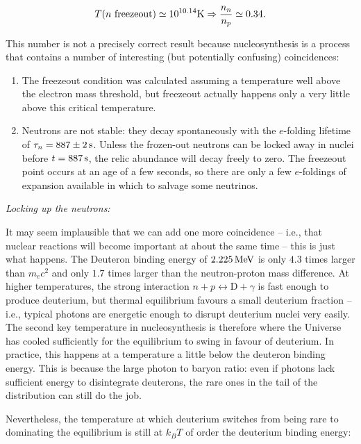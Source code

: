 \documentclass[a4paper,11pt]{article}
\begin{document}
\begin{align*}
    T(n~{\rm freezeout}) \simeq 10^{10.14} {\rm K} \Rightarrow \frac{n_n}{n_p} \simeq 0.34.
\end{align*}

{\noindent}This number is not a precisely correct result because nucleosynthesis is a process that contains a number of interesting (but potentially confusing) coincidences:

\begin{enumerate}
  \item The freezeout condition was calculated assuming a temperature well above the electron mass threshold, but freezeout actually happens only a very little above this critical temperature.
  \item Neutrons are not stable: they decay spontaneously with the $e$-folding lifetime of $\tau_n=887\pm2\,{\rm s}$. Unless the frozen-out neutrons can be locked away in nuclei before $t=887\,{\rm s}$, the relic abundance will decay freely to zero. The freezeout point occurs at an age of a few seconds, so there are only a few $e$-foldings of expansion available in which to salvage some neutrinos.
\end{enumerate}

{\noindent}\textit{Locking up the neutrons:}

{\noindent}It may seem implausible that we can add one more coincidence -- i.e., that nuclear reactions will become important at about the same time -- this is just what happens. The Deuteron binding energy of $2.225\,{\rm MeV}$ is only $4.3$ times larger than $m_ec^2$ and only $1.7$ times larger than the neutron-proton mass difference. At higher temperatures, the strong interaction $n+p \leftrightarrow \mathrm{D}+\gamma$ is fast enough to produce deuterium, but thermal equilibrium favours a small deuterium fraction -- i.e., typical photons are energetic enough to disrupt deuterium nuclei very easily. The second key temperature in nucleosynthesis is therefore where the Universe has cooled sufficiently for the equilibrium to swing in favour of deuterium. In practice, this happens at a temperature a little below the deuteron binding energy. This is because the large photon to baryon ratio: even if photons lack sufficient energy to disintegrate deuterons, the rare ones in the tail of the distribution can still do the job. 

{\noindent}Nevertheless, the temperature at which deuterium switches from being rare to dominating the equilibrium is still at $k_BT$ of order the deuterium binding energy:
\end{document}
